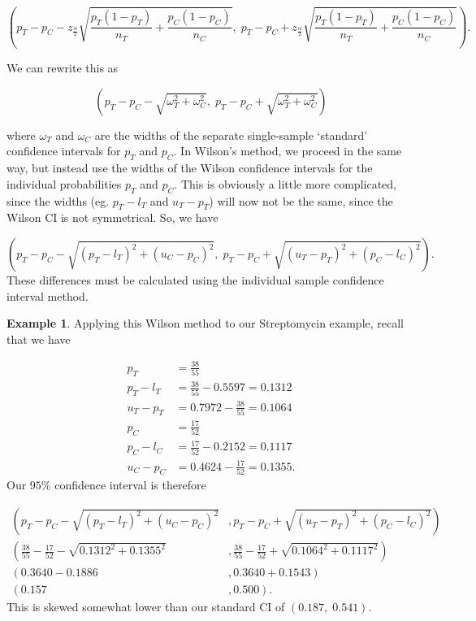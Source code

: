 \documentclass[
  openany]{book}
\theoremstyle{definition}
\theoremstyle{definition}
\newtheorem{example}{Example}[chapter]
\theoremstyle{definition}
\theoremstyle{definition}
\theoremstyle{remark}
\begin{document}
\begin{equation}
\left(p_T - p_C - z_{\frac{\alpha}{2}}\sqrt{\frac{p_T\left(1-p_T\right)}{n_T} + \frac{p_C\left(1-p_C\right)}{n_C}},\; p_T - p_C + z_{\frac{\alpha}{2}}\sqrt{\frac{p_T\left(1-p_T\right)}{n_T} + \frac{p_C\left(1-p_C\right)}{n_C}}\right).
\label{eq:ardci}
\end{equation}

We can rewrite this as

\begin{equation}
\left(p_T - p_C - \sqrt{\omega^2_T + \omega^2_C},\; p_T - p_C + \sqrt{\omega^2_T + \omega^2_C}\right)
\end{equation}

where \(\omega_T\) and \(\omega_C\) are the widths of the separate single-sample `standard' confidence intervals for \(p_T\) and \(p_C\). In Wilson's method, we proceed in the same way, but instead use the widths of the Wilson confidence intervals for the individual probabilities \(p_T\) and \(p_C\). This is obviously a little more complicated, since the widths (eg. \(p_T - l_T\) and \(u_T - p_T\)) will now not be the same, since the Wilson CI is not symmetrical. So, we have

\[
\left(p_T - p_C - \sqrt{\left(p_T-l_T\right)^2 + \left(u_C - p_C\right)^2},\; p_T - p_C + \sqrt{\left(u_T - p_T\right)^2 + \left(p_C - l_C\right)^2}\right).
\]
These differences must be calculated using the individual sample confidence interval method.

\begin{example}
Applying this Wilson method to our Streptomycin example, recall that we have

\[
\begin{aligned}
p_T & = \frac{38}{55}\\
p_T - l_T & = \frac{38}{55} - 0.5597 = 0.1312\\
u_T - p_T & = 0.7972 - \frac{38}{55} = 0.1064\\
p_C & = \frac{17}{52} \\
p_C - l_C & = \frac{17}{52}  - 0.2152 = 0.1117\\
u_C - p_C & = 0.4624 - \frac{17}{52} = 0.1355.
\end{aligned}
\]
Our \(95\%\) confidence interval is therefore

\[
\begin{aligned}
\left(p_T - p_C - \sqrt{\left(p_T-l_T\right)^2 + \left(u_C - p_C\right)^2}\right.&,\left. p_T - p_C + \sqrt{\left(u_T - p_T\right)^2 + \left(p_C - l_C\right)^2}\right)\\
\left(\frac{38}{55}-\frac{17}{52} - \sqrt{0.1312^2 + 0.1355^2}\right.&,\left.\frac{38}{55}-\frac{17}{52} + \sqrt{0.1064^2 + 0.1117^2}\right)\\
\left(0.3640 - 0.1886 \right.&,\left. 0.3640+ 0.1543\right)\\
\left(0.157 \right.&,\left.0.500\right).
\end{aligned}
\]
This is skewed somewhat lower than our standard CI of \(\left(0.187,\;0.541\right).\)
\end{example}
\end{document}
